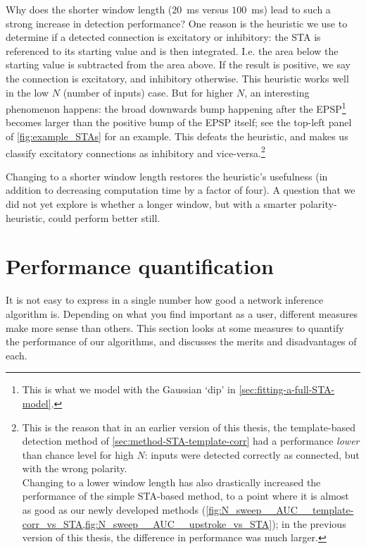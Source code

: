 Why does the shorter window length ($20$~ms versus $100$~ms) lead to such a strong increase in detection performance?
One reason is the heuristic we use to determine if a detected connection is excitatory or inhibitory: the STA is referenced to its starting value and is then integrated. I.e. the area below the starting value is subtracted from the area above. If the result is positive, we say the connection is excitatory, and inhibitory otherwise.
This heuristic works well in the low $N$ (number of inputs) case. But for higher $N$, an interesting phenomenon happens: the broad downwards bump happening after the EPSP\footnote{
    This is what we model with the Gaussian `dip' in \cref{sec:fitting-a-full-STA-model}.
}
becomes larger than the positive bump of the EPSP itself; see the top-left panel of \cref{fig:example_STAs} for an example. This defeats the heuristic, and makes us classify excitatory connections as inhibitory and vice-versa.\footnote{
    This is the reason that in an earlier version of this thesis, the template-based detection method of \cref{sec:method-STA-template-corr} had a performance \emph{lower} than chance level for high $N$: inputs were detected correctly as connected, but with the wrong polarity.\\
    Changing to a lower window length has also drastically increased the performance of the simple STA-based method, to a point where it is almost as good as our newly developed methods (\cref{fig:N_sweep__AUC__template-corr_vs_STA,fig:N_sweep__AUC__upstroke_vs_STA}); in the previous version of this thesis, the difference in performance was much larger.
}

Changing to a shorter window length restores the heuristic's usefulness (in addition to decreasing computation time by a factor of four).
A question that we did not yet explore is whether a longer window, but with a smarter polarity-heuristic, could perform better still.



\FloatBarrier
\section{Performance quantification}
\label{sec:perf_quant}

It is not easy to express in a single number how good a network inference algorithm is. Depending on what you find important as a user, different measures make more sense than others. This section looks at some measures to quantify the performance of our algorithms, and discusses the merits and disadvantages of each.

